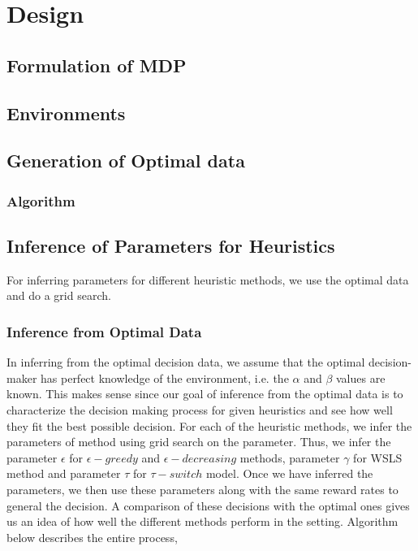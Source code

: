 \section{Design}
\label{design}


\subsection{Formulation of MDP}

\subsection{Environments}



\subsection{Generation of Optimal data}

\subsubsection{Algorithm}



\subsection{Inference of Parameters for Heuristics}
For inferring parameters for different heuristic methods, we use the optimal data and do a grid search. 


\subsubsection{Inference from Optimal Data}
In inferring from the optimal decision data, we assume that the optimal decision-maker has perfect knowledge of the environment, i.e. the $\alpha$ and $\beta$ values are known. This makes sense since our goal of inference from the optimal data is to characterize the decision making process for given heuristics and see how well they fit the best possible decision. For each of the heuristic methods, we infer the parameters of method using grid search on the parameter. Thus, we infer the parameter $\epsilon$ for $\epsilon-greedy$ and $\epsilon-decreasing$ methods, parameter $\gamma$ for WSLS method and parameter $\tau$ for $\tau-switch$ model. Once we have inferred the parameters, we then use these parameters along with the same reward rates to general the decision. A comparison of these decisions with the optimal ones gives us an idea of how well the different methods perform in the setting. Algorithm below describes the entire process,



